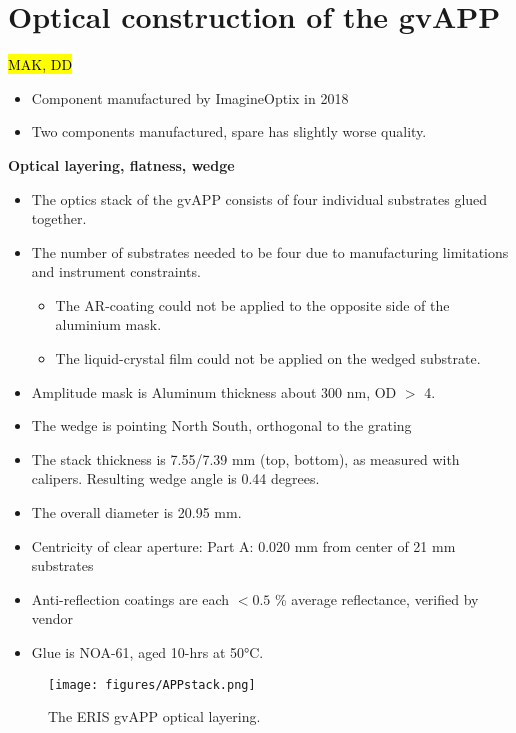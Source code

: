 \documentclass{aa}
\begin{document}
\section{Optical construction of the gvAPP}

\hl{MAK, DD}
\begin{itemize}
    \item Component manufactured by ImagineOptix in 2018
    \item Two components manufactured, spare has slightly worse quality.
\end{itemize}

\textbf{Optical layering, flatness, wedge}
\begin{itemize}
    \item The optics stack of the gvAPP consists of four individual substrates glued together.
    \item The number of substrates needed to be four due to manufacturing limitations and instrument constraints.
    \begin{itemize}
        \item The AR-coating could not be applied to the opposite side of the aluminium mask.
        \item The liquid-crystal film could not be applied on the wedged substrate.
    \end{itemize}
    \item Amplitude mask is Aluminum thickness about 300 nm, OD $>$ 4.
    \item The wedge is pointing North South, orthogonal to the grating
    \item The stack thickness is 7.55/7.39 mm (top, bottom), as measured with calipers. Resulting wedge angle is 0.44 degrees.
    \item The overall diameter is 20.95 mm.
    \item Centricity of clear aperture: Part A: 0.020 mm from center of 21 mm substrates
    \item Anti-reflection coatings are each $< 0.5$ \% average reflectance, verified by vendor
    \item Glue is NOA-61, aged 10-hrs at 50°C.
\end{itemize}



\begin{figure}
    \centering
    \texttt{[image: figures/APPstack.png]}
    \caption{The ERIS gvAPP optical layering.}
    \label{fig:optical_layering}
\end{figure}
\end{document}
